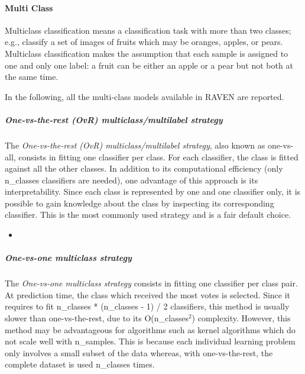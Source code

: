 \paragraph{Multi Class}
\label{Multiclass}
Multiclass classification means a classification task with more than two
classes; e.g., classify a set of images of fruits which may be oranges, apples,
or pears.
%
Multiclass classification makes the assumption that each sample is assigned to
one and only one label: a fruit can be either an apple or a pear but not both at
the same time.


%
In the following, all the multi-class models available in RAVEN are reported.
%
\subparagraph{One-vs-the-rest (OvR) multiclass/multilabel strategy}
\mbox{}

The \textit{One-vs-the-rest (OvR) multiclass/multilabel strategy}, also known
as one-vs-all, consists in fitting one classifier per class.
%
For each classifier, the class is fitted against all the other classes.
%
In addition to its computational efficiency (only n\_classes classifiers are
needed), one advantage of this approach is its interpretability.
%
Since each class is represented by one and one classifier only, it is possible
to gain knowledge about the class by inspecting its corresponding classifier.
%
This is the most commonly used strategy and is a fair default choice.

\begin{itemize}
  \item \estimatorDescription{}
\end{itemize}

\subparagraph{One-vs-one multiclass strategy}
\mbox{}

The \textit{One-vs-one multiclass strategy} consists in fitting one classifier
per class pair.
%
At prediction time, the class which received the most votes is selected.
%
Since it requires to fit n\_classes * (n\_classes - 1) / 2 classifiers, this
method is usually slower than one-vs-the-rest, due to its O(n\_classes$^2$)
complexity.
%
However, this method may be advantageous for algorithms such as kernel
algorithms which do not scale well with n\_samples.
%
This is because each individual learning problem only involves a small subset of
the data whereas, with one-vs-the-rest, the complete dataset is used n\_classes
times.

